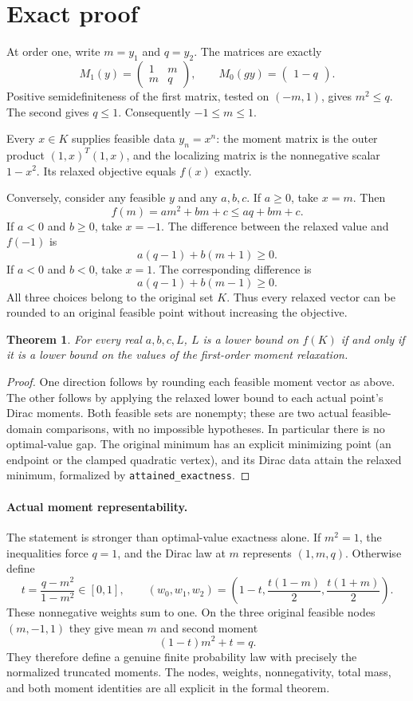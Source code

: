 \documentclass[11pt]{article}
\newtheorem{theorem}{Theorem}
\begin{document}
\newpage
\section*{Exact proof}
At order one, write $m=y_1$ and $q=y_2$. The matrices are exactly
\[
M_1(y)=\begin{pmatrix}1&m\\m&q\end{pmatrix},\qquad
M_0(g y)=\begin{pmatrix}1-q\end{pmatrix}.
\]
Positive semidefiniteness of the first matrix, tested on $(-m,1)$, gives $m^2\leq q$. The second gives $q\leq1$. Consequently $-1\leq m\leq1$.

Every $x\in K$ supplies feasible data $y_n=x^n$: the moment matrix is the outer product $(1,x)^T(1,x)$, and the localizing matrix is the nonnegative scalar $1-x^2$. Its relaxed objective equals $f(x)$ exactly.

Conversely, consider any feasible $y$ and any $a,b,c$. If $a\geq0$, take $x=m$. Then
\[
f(m)=am^2+bm+c\leq aq+bm+c.
\]
If $a<0$ and $b\geq0$, take $x=-1$. The difference between the relaxed value and $f(-1)$ is
\[
a(q-1)+b(m+1)\geq0.
\]
If $a<0$ and $b<0$, take $x=1$. The corresponding difference is
\[
a(q-1)+b(m-1)\geq0.
\]
All three choices belong to the original set $K$. Thus every relaxed vector can be rounded to an original feasible point without increasing the objective.

\begin{theorem}
For every real $a,b,c,L$, $L$ is a lower bound on $f(K)$ if and only if it is a lower bound on the values of the first-order moment relaxation.
\end{theorem}
\begin{proof}
One direction follows by rounding each feasible moment vector as above. The other follows by applying the relaxed lower bound to each actual point's Dirac moments. Both feasible sets are nonempty; these are two actual feasible-domain comparisons, with no impossible hypotheses. In particular there is no optimal-value gap. The original minimum has an explicit minimizing point (an endpoint or the clamped quadratic vertex), and its Dirac data attain the relaxed minimum, formalized by \texttt{attained\_exactness}.
\end{proof}

\paragraph{Actual moment representability.}
The statement is stronger than optimal-value exactness alone. If $m^2=1$, the inequalities force $q=1$, and the Dirac law at $m$ represents $(1,m,q)$. Otherwise define
\[
t=\frac{q-m^2}{1-m^2}\in[0,1],\qquad
(w_0,w_1,w_2)=\left(1-t,\frac{t(1-m)}2,\frac{t(1+m)}2\right).
\]
These nonnegative weights sum to one. On the three original feasible nodes $(m,-1,1)$ they give mean $m$ and second moment
\[
(1-t)m^2+t=q.
\]
They therefore define a genuine finite probability law with precisely the normalized truncated moments. The nodes, weights, nonnegativity, total mass, and both moment identities are all explicit in the formal theorem.
\end{document}
